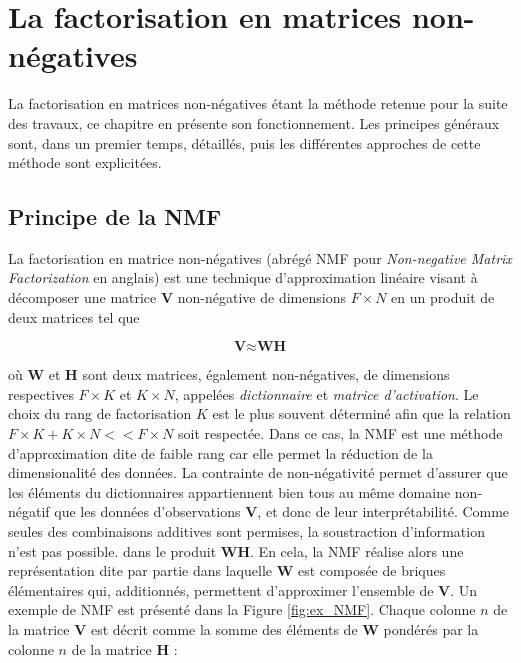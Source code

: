 %
%
%
%
%
\chapter{La factorisation en matrices non-négatives}
La factorisation en matrices non-négatives étant la méthode retenue pour la suite des travaux, ce chapitre en présente son fonctionnement. Les principes généraux sont, dans un premier temps, détaillés, puis les différentes approches de cette méthode sont explicitées.

\section{Principe de la NMF}
La factorisation en matrice non-négatives (abrégé NMF pour \textit{Non-negative Matrix Factorization} en anglais) est une technique d'approximation linéaire visant à décomposer une matrice $\textbf{V}$ non-négative de dimensions $F \times N$ en un produit de deux matrices tel que

\begin{equation}
\textbf{V} \approx \textbf{WH}
\end{equation}

où $\textbf{W}$ et $\textbf{H}$ sont deux matrices, également non-négatives, de dimensions respectives $F \times K$ et $K \times N$, appelées \textit{dictionnaire} et \textit{matrice d'activation}. Le choix du rang de factorisation $K$ est le plus souvent déterminé afin que la relation $F \times K + K \times N << F \times N$ soit respectée. Dans ce cas, la NMF est une méthode d'approximation dite de faible rang car elle permet la réduction de la dimensionalité des données. La contrainte de non-négativité permet d'assurer que les éléments du dictionnaires appartiennent bien tous au même domaine non-négatif que les données d'observations $\mathbf{V}$, et donc de leur interprétabilité. Comme seules des combinaisons additives sont permises, la soustraction d'information n'est pas possible. dans le produit $\mathbf{WH}$. En cela, la NMF réalise alors une représentation dite \og par partie \fg{} dans laquelle $\mathbf{W}$ est composée de briques élémentaires qui, additionnés, permettent d'approximer l'ensemble de $\mathbf{V}$. Un exemple de NMF est présenté dans la Figure \ref{fig:ex_NMF}. Chaque colonne $n$ de la matrice $\mathbf{V}$ est décrit comme la somme des éléments de $\mathbf{W}$ pondérés par la colonne $n$ de la matrice $\mathbf{H}$ :

